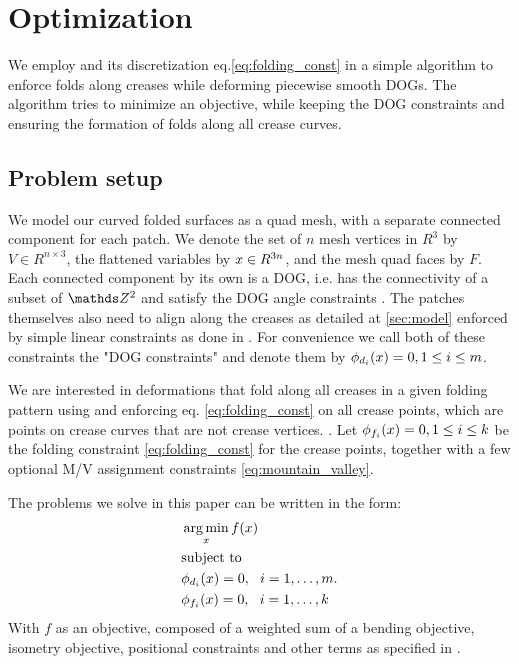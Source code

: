 \section{Optimization} \label{sec:implementation}
We employ  and its discretization eq.\eqref{eq:folding_const} in a simple algorithm to enforce folds along creases while deforming piecewise smooth DOGs. The algorithm tries to minimize an objective, while keeping the DOG constraints and ensuring the formation of folds along all crease curves.

\subsection{Problem setup}
We model our curved folded surfaces as a quad mesh, with a separate connected component for each patch. We denote the set of $n$ mesh vertices in $R^3$ by $V \in R^{n\times3}$, the flattened variables by $x \in R^{3n}$, and the mesh quad faces by $F$. Each connected component by its own is a DOG, i.e. has the connectivity of a subset of $\Z^2$ and satisfy the DOG angle constraints \cite{rabi18}. The patches themselves also need to align along the creases as detailed at \ref{sec:model} enforced by simple linear constraints as done in \cite{rabi2018shape}. For convenience we call both of these constraints the "DOG constraints" and denote them by $\phi_{d_i}(x) = 0, 1 \leq i \leq m$.

We are interested in deformations that fold along all creases in a given folding pattern using  and enforcing eq. \eqref{eq:folding_const} on all crease points, which are points on crease curves that are not crease vertices. . Let $\phi_{f_i}(x) = 0, 1 \leq i \leq k$ be the folding constraint \eqref{eq:folding_const} for the crease points, together with a few optional M/V assignment constraints \eqref{eq:mountain_valley}.

The problems we solve in this paper can be written in the form:
\begin{equation} \label{eq:const_opt}
\begin{aligned}
& \operatorname*{arg\,min}_x f(x) \\
& \textrm{subject to} \\
& \phi_{d_i}(x) = 0, \ \  i = 1, \ldots, m. \\
& \phi_{f_i}(x) = 0, \ \  i = 1, \ldots, k \\ 
\end{aligned}
\end{equation}
With $f$ as an objective, composed of a weighted sum of a bending objective, isometry objective, positional constraints and other terms as specified in .

